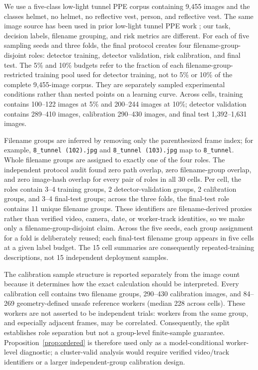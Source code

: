 \documentclass[iicol,pdflatex,sn-mathphys-num]{sn-jnl}
\begin{document}
We use a five-class low-light tunnel PPE corpus containing 9,455 images and the classes helmet, no helmet, no reflective vest, person, and reflective vest. The same image source has been used in prior low-light tunnel PPE work \cite{wang2023lowlight}; our task, decision labels, filename grouping, and risk metrics are different. For each of five sampling seeds and three folds, the final protocol creates four filename-group-disjoint roles: detector training, detector validation, risk calibration, and final test. The 5\% and 10\% budgets refer to the fraction of each filename-group-restricted training pool used for detector training, not to 5\% or 10\% of the complete 9,455-image corpus. They are separately sampled experimental conditions rather than nested points on a learning curve. Across cells, training contains 100--122 images at 5\% and 200--244 images at 10\%; detector validation contains 289--410 images, calibration 290--430 images, and final test 1,392--1,631 images.

Filename groups are inferred by removing only the parenthesized frame index; for example, \texttt{8\_tunnel (102).jpg} and \texttt{8\_tunnel (103).jpg} map to \texttt{8\_tunnel}. Whole filename groups are assigned to exactly one of the four roles. The independent protocol audit found zero path overlap, zero filename-group overlap, and zero image-hash overlap for every pair of roles in all 30 cells. Per cell, the roles contain 3--4 training groups, 2 detector-validation groups, 2 calibration groups, and 3--4 final-test groups; across the three folds, the final-test role contains 11 unique filename groups. These identifiers are filename-derived proxies rather than verified video, camera, date, or worker-track identities, so we make only a filename-group-disjoint claim. Across the five seeds, each group assignment for a fold is deliberately reused; each final-test filename group appears in five cells at a given label budget. The 15 cell summaries are consequently repeated-training descriptions, not 15 independent deployment samples.

The calibration sample structure is reported separately from the image count because it determines how the exact calculation should be interpreted. Every calibration cell contains two filename groups, 290--430 calibration images, and 84--269 geometry-defined unsafe reference workers (median 228 across cells). These workers are not asserted to be independent trials: workers from the same group, and especially adjacent frames, may be correlated. Consequently, the split establishes role separation but not a group-level finite-sample guarantee. Proposition~\ref{prop:ordered} is therefore used only as a model-conditional worker-level diagnostic; a cluster-valid analysis would require verified video/track identifiers or a larger independent-group calibration design.
\end{document}
